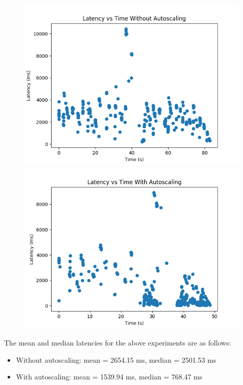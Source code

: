 \documentclass{article}
\begin{document}
\begin{itemize}
\begin{figure}[H]
\begin{minipage}{0.45\textwidth}
            \centering
            \includegraphics[width=\linewidth]{../plots/latency_without_autoscaling.png}
        \end{minipage}\hfill
        \begin{minipage}{0.45\textwidth}
            \centering
            \includegraphics[width=\linewidth]{../plots/latency_with_autoscaling.png}
        \end{minipage}
    \end{figure}

    The mean and median latencies for the above experiments are as follows:
    \begin{itemize}
        \item Without autoscaling: mean = 2654.15 ms, median = 2501.53 ms
        \item With autoscaling: mean = 1539.94 ms, median = 768.47 ms
    \end{itemize}


\end{itemize}
\end{document}

